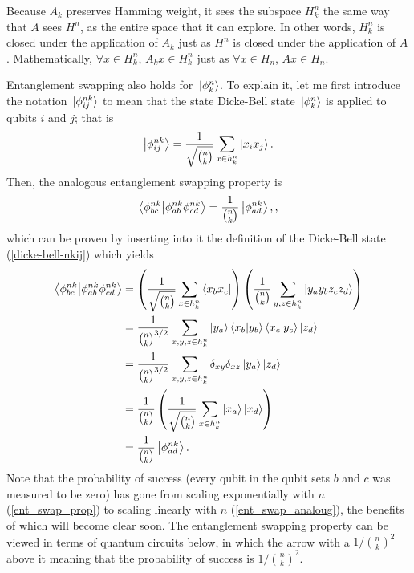\documentclass[10pt]{article}
\begin{document}
Because $A_k$ preserves Hamming weight, it sees the subspace $H^n_k$ the same way that $A$ sees $H^n$, as the entire space that it can explore. In other words, $H^n_k$ is closed under the application of $A_k$ just as $H^n$ is closed under the application of $A$. Mathematically, $\forall x\in H^n_k$, $A_kx\in H^n_k$ just as $\forall x\in H_n$, $Ax\in H_n$. 

Entanglement swapping also holds for $\ket*{\phi^n_k}$. To explain it, let me first introduce the notation $\ket*{\phi^{nk}_{ij}}$ to mean that the state Dicke-Bell state $\ket*{\phi^n_k}$ is applied to qubits $i$ and $j$; that is
\begin{align}
\label{dicke-bell-nkij}
\ket{\phi^{nk}_{ij}} = \frac{1}{\sqrt{{n \choose k}}}\sum_{x \in h^n_k}\ket{x_ix_j}.
\end{align}
Then, the analogous entanglement swapping property is
\begin{align}
\label{ent_swap_analoug}
\bra{\phi^{nk}_{bc}}\ket{\phi^{nk}_{ab}\phi^{nk}_{cd}}
=
\frac{1}{{n \choose k}}\ket{\phi^{nk}_{ad}},
,\end{align}
which can be proven by inserting into it the definition of the Dicke-Bell state (\ref{dicke-bell-nkij}) which yields
\begin{align}
\bra{\phi^{nk}_{bc}}\ket{\phi^{nk}_{ab}\phi^{nk}_{cd}}
&=
\left(
\frac{1}{\sqrt{{n \choose k}}}
\sum_{x\in h^n_k}\bra{x_bx_c}
\right)
\left(
\frac{1}{{n \choose k}}
\sum_{y,z\in h^n_k}\ket{y_ay_bz_cz_d}
\right)
\\
&=
\frac{1}{{n \choose k}^{3/2}}
\sum_{x,y,z\in h^n_k}\ket{y_a}\bra{x_b}\ket{y_b}\bra{x_c}\ket{y_c}\ket{z_d}
\\
&=
\frac{1}{{n \choose k}^{3/2}}
\sum_{x,y,z\in h^n_k}\delta_{xy}\delta_{xz}\ket{y_a}\ket{z_d}
\\
&=
\frac{1}{{n \choose k}}
\left(
\frac{1}{\sqrt{{n \choose k}}}
\sum_{x\in h^n_k}\ket{x_a}\ket{x_d}
\right)
\\
&=
\frac{1}{{n \choose k}}\ket{\phi^{nk}_{ad}}
.\end{align}
Note that the probability of success (every qubit in the qubit sets $b$ and $c$ was measured to be zero) has gone from scaling exponentially with $n$ (\ref{ent_swap_prop}) to scaling linearly with $n$ (\ref{ent_swap_analoug}), the benefits of which will become clear soon. The entanglement swapping property can be viewed in terms of quantum circuits below, in which the arrow with a $1/{n \choose k}^2$ above it meaning that the probability of success is $1/{n \choose k}^2$.
\end{document}
